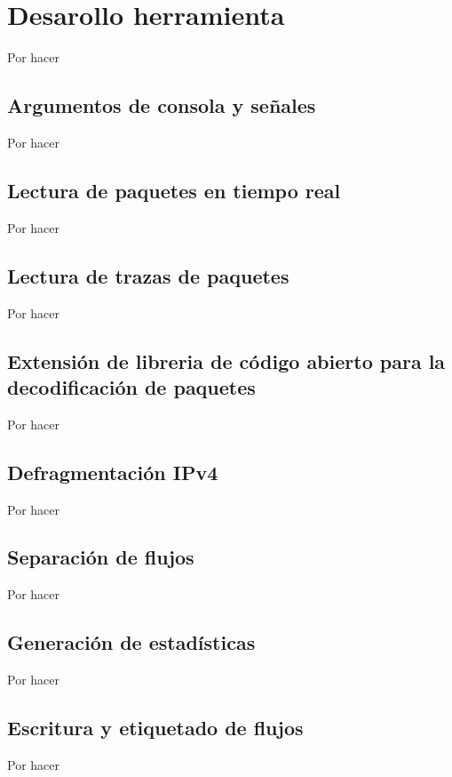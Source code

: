 \section{Desarollo herramienta}

Por hacer

\subsection{Argumentos de consola y señales}

Por hacer

\subsection{Lectura de paquetes en tiempo real}

Por hacer

\subsection{Lectura de trazas de paquetes}

Por hacer

\subsection{Extensión de libreria de código abierto para la decodificación de paquetes}

Por hacer

\subsection{Defragmentación IPv4}

Por hacer

\subsection{Separación de flujos}

Por hacer

\subsection{Generación de estadísticas}

Por hacer

\subsection{Escritura y etiquetado de flujos}

Por hacer

